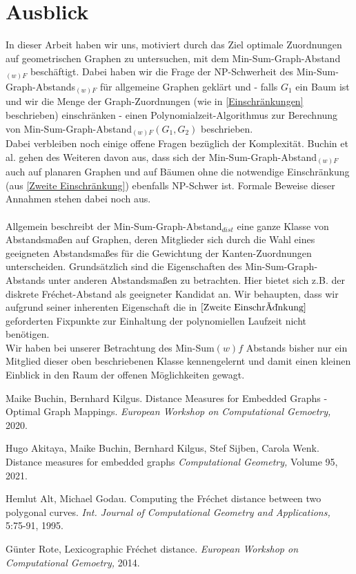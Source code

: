\documentclass[a4paper, 12pt, twoside]{article}
\theoremstyle{Format1} %
\begin{document}
\section{Ausblick}
In dieser Arbeit haben wir uns, motiviert durch das Ziel optimale Zuordnungen auf geometrischen Graphen zu untersuchen, mit dem
Min-Sum-Graph-Abstand$_{(w)F}$ beschäftigt. Dabei haben wir die Frage der NP-Schwerheit des Min-Sum-Graph-Abstands$_{(w)F}$ für allgemeine
Graphen geklärt und - falls $G_1$ ein Baum ist und wir die Menge der Graph-Zuordnungen (wie in \ref{Einschränkungen} beschrieben) einschränken -
einen Polynomialzeit-Algorithmus zur Berechnung von Min-Sum-Graph-Abstand$_{(w)F}(G_1, G_2)$ beschrieben.
\\
Dabei verbleiben noch einige offene Fragen bezüglich der Komplexität.
Buchin et al. gehen des Weiteren davon aus, dass sich der Min-Sum-Graph-Abstand$_{(w)F}$ auch auf planaren Graphen und
auf Bäumen ohne die notwendige Einschränkung (aus \ref{Zweite Einschränkung}) ebenfalls NP-Schwer ist.
Formale Beweise dieser Annahmen stehen dabei noch aus.
\\
\\
Allgemein beschreibt der Min-Sum-Graph-Abstand$_{dist}$ eine ganze Klasse von Abstandsmaßen auf Graphen, deren Mitglieder sich durch die Wahl
eines geeigneten Abstandsmaßes für die Gewichtung der Kanten-Zuordnungen unterscheiden.
Grundsätzlich sind die Eigenschaften des Min-Sum-Graph-Abstands unter anderen Abstandsmaßen zu betrachten. Hier bietet sich z.B. der
diskrete Fréchet-Abstand als geeigneter Kandidat an. Wir behaupten, dass wir aufgrund seiner inherenten Eigenschaft die in $\ref{Zweite Einschränkung}$
geforderten Fixpunkte zur Einhaltung der polynomiellen Laufzeit nicht benötigen.
\\
Wir haben bei unserer Betrachtung des Min-Sum${(w)f}$ Abstands bisher nur ein Mitglied dieser oben beschriebenen Klasse kennengelernt und
damit einen kleinen Einblick in den Raum der offenen Möglichkeiten gewagt.
\newpage\null\thispagestyle{empty}\newpage

\begin{thebibliography}{4}
		Maike Buchin, Bernhard Kilgus. Distance Measures for Embedded Graphs - Optimal Graph Mappings.
		\textit{European Workshop on Computational Gemoetry,} 2020.

		Hugo Akitaya, Maike Buchin, Bernhard Kilgus, Stef Sijben, Carola Wenk. Distance measures for embedded graphs
		\textit{Computational Geometry,} Volume 95, 2021.

		Hemlut Alt, Michael Godau. Computing the Fréchet distance between two polygonal curves.
		\textit{Int. Journal of Computational Geometry and Applications,} 5:75-91, 1995.

		Günter Rote, Lexicographic Fréchet distance.
		\textit{European Workshop on Computational Gemoetry,} 2014.

\end{thebibliography}


\end{document}
